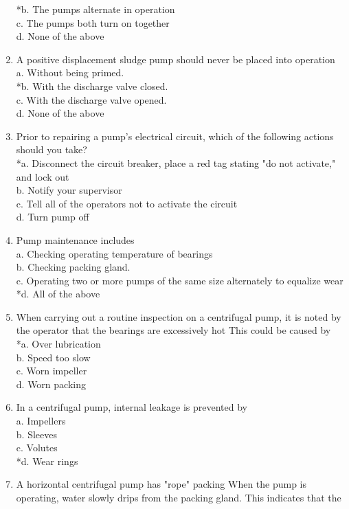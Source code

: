 \begin{enumerate}[1.]
*b. The pumps alternate in operation\\
c. The pumps both turn on together\\
d. None of the above\\
\item A positive displacement sludge pump should never be placed into operation\\
a. Without being primed.\\
*b. With the discharge valve closed.\\
c. With the discharge valve opened.\\
d. None of the above\\
\item Prior to repairing a pump's electrical circuit, which of the following actions should you take?\\
*a. Disconnect the circuit breaker, place a red tag stating "do not activate," and lock out\\
b. Notify your supervisor\\
c. Tell all of the operators not to activate the circuit\\
d. Turn pump off\\
\item Pump maintenance includes\\
a. Checking operating temperature of bearings\\
b. Checking packing gland.\\
c. Operating two or more pumps of the same size alternately to equalize wear\\
*d. All of the above\\
\item When carrying out a routine inspection on a centrifugal pump, it is noted by the operator that the bearings are excessively hot This could be caused by\\
*a. Over lubrication\\
b. Speed too slow\\
c. Worn impeller\\
d. Worn packing\\
\item In a centrifugal pump, internal leakage is prevented by\\
a. Impellers\\
b. Sleeves\\
c. Volutes\\
*d. Wear rings\\
\item A horizontal centrifugal pump has "rope" packing When the pump is operating, water slowly drips from the packing gland. This indicates that the\\

\end{enumerate}
